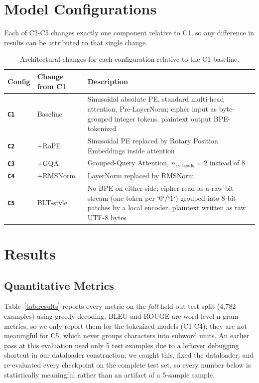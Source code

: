 \documentclass[12pt,a4paper]{article}
\newcommand{\modelname}[1]{\textbf{\texttt{#1}}}
\begin{document}
\section{Model Configurations}

Each of C2-C5 changes exactly one component relative to C1, so any difference in results can be attributed to that single change.

\begin{table}[H]
\centering
\small
\begin{tabularx}{\linewidth}{llX}
\toprule
\textbf{Config} & \textbf{Change from C1} & \textbf{Description} \\
\midrule
\modelname{C1} & Baseline & Sinusoidal absolute PE, standard multi-head attention, Pre-LayerNorm; cipher input as byte-grouped integer tokens, plaintext output BPE-tokenized \\
\modelname{C2} & +RoPE \cite{su2024roformer} & Sinusoidal PE replaced by Rotary Position Embeddings inside attention \\
\modelname{C3} & +GQA \cite{ainslie2023gqa} & Grouped-Query Attention, $n_{\text{kv\_heads}}=2$ instead of 8 \\
\modelname{C4} & +RMSNorm \cite{zhang2019rmsnorm} & LayerNorm replaced by RMSNorm \\
\modelname{C5} & BLT-style \cite{pagnoni2024blt} & No BPE on either side; cipher read as a raw bit stream (one token per `0`/`1`) grouped into 8-bit patches by a local encoder, plaintext written as raw UTF-8 bytes \\
\bottomrule
\end{tabularx}
\caption{Architectural changes for each configuration relative to the C1 baseline.}
\end{table}

\section{Results}

\subsection{Quantitative Metrics}

Table~\ref{tab:results} reports every metric on the \emph{full} held-out test split (4,782 examples) using greedy decoding. BLEU and ROUGE are word-level n-gram metrics, so we only report them for the tokenized models (C1-C4); they are not meaningful for C5, which never groups characters into subword units. An earlier pass at this evaluation used only 5 test examples due to a leftover debugging shortcut in our dataloader construction; we caught this, fixed the dataloader, and re-evaluated every checkpoint on the complete test set, so every number below is statistically meaningful rather than an artifact of a 5-sample sample.
\end{document}
